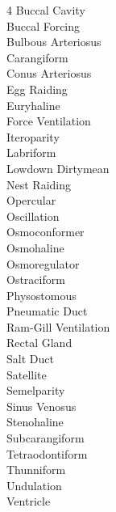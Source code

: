 
\begin{multicols}{4}
Buccal Cavity \\
Buccal Forcing \\
Bulbous Arteriosus \\
Carangiform \\
Conus Arteriosus \\
Egg Raiding \\
Euryhaline \\
Force Ventilation \\
Iteroparity \\
Labriform \\
Lowdown Dirtymean \\
Nest Raiding \\
Opercular \\
Oscillation \\
Osmoconformer \\
Osmohaline \\
Osmoregulator \\
Ostraciform \\
Physostomous \\
Pneumatic Duct \\
Ram-Gill Ventilation \\
Rectal Gland \\
Salt Duct \\
Satellite \\
Semelparity \\
Sinus Venosus \\
Stenohaline \\
Subcarangiform \\
Tetraodontiform \\
Thunniform \\
Undulation \\
Ventricle 
\end{multicols}